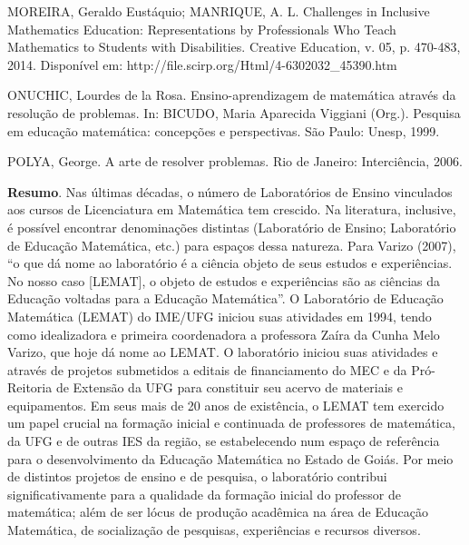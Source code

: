 \begin{thebibliography}{999}
	 MOREIRA, Geraldo Eustáquio; MANRIQUE, A. L. Challenges in Inclusive Mathematics Education: Representations by Professionals Who Teach Mathematics to Students with Disabilities. Creative Education, v. 05, p. 470-483, 2014. Disponível em: http://file.scirp.org/Html/4-6302032\_45390.htm
	
	 ONUCHIC, Lourdes de la Rosa. Ensino-aprendizagem de matemática através da resolução de problemas. In: BICUDO, Maria Aparecida Viggiani (Org.). Pesquisa em educação matemática: concepções e perspectivas. São Paulo: Unesp, 1999.
	
	 POLYA, George. A arte de resolver problemas. Rio de Janeiro: Interciência, 2006.
	\end{thebibliography}

\vspace{24pt}
	
	
	
	\noindent\textbf{Resumo}.\label{scd} 
	Nas últimas décadas, o número de Laboratórios de Ensino vinculados aos cursos de Licenciatura em Matemática tem crescido. Na literatura, inclusive, é possível encontrar denominações distintas (Laboratório de Ensino; Laboratório de Educação Matemática, etc.) para espaços dessa natureza. Para Varizo (2007), “o que dá nome ao laboratório é a ciência objeto de seus estudos e experiências. No nosso caso [LEMAT], o objeto de estudos e experiências são as ciências da Educação voltadas para a Educação Matemática”. O Laboratório de Educação Matemática (LEMAT) do IME/UFG iniciou suas atividades em 1994, tendo como idealizadora e primeira coordenadora a professora Zaíra da Cunha Melo Varizo, que hoje dá nome ao LEMAT. O laboratório iniciou suas atividades e através de projetos submetidos a editais de financiamento do MEC e da Pró-Reitoria de Extensão da UFG para constituir seu acervo de materiais e equipamentos. Em seus mais de 20 anos de existência, o LEMAT tem exercido um papel crucial na formação inicial e continuada de professores de matemática, da UFG e de outras IES da região, se estabelecendo num espaço de referência para o desenvolvimento da Educação Matemática no Estado de Goiás. Por meio de distintos projetos de ensino e de pesquisa, o laboratório contribui significativamente para a qualidade da formação inicial do professor de matemática; além de ser lócus de produção acadêmica na área de Educação Matemática, de socialização de pesquisas, experiências e recursos diversos.
	

